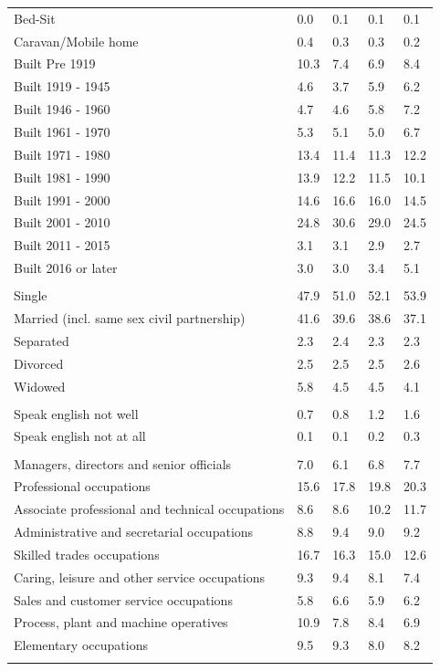 \documentclass{article}
\begin{document}
\begin{table}[h]
\begin{tabular}{KTTTT}
Bed-Sit & 0.0& 0.1& 0.1& 0.1\\
Caravan/Mobile home & 0.4& 0.3& 0.3& 0.2\\
    \hline
Built Pre 1919 & 10.3&  7.4&  6.9&  8.4\\
Built 1919 - 1945 & 4.6& 3.7& 5.9& 6.2\\
Built  1946 - 1960 & 4.7& 4.6& 5.8& 7.2\\
Built  1961 - 1970 & 5.3& 5.1& 5.0& 6.7\\
Built  1971 - 1980 & 13.4& 11.4& 11.3& 12.2\\
Built  1981 - 1990 & 13.9& 12.2& 11.5& 10.1\\
Built  1991 - 2000 & 14.6& 16.6& 16.0& 14.5\\
Built  2001 - 2010 & 24.8& 30.6& 29.0& 24.5\\
Built  2011 - 2015 & 3.1& 3.1& 2.9& 2.7\\
Built  2016 or later & 3.0& 3.0& 3.4& 5.1\\
\hline
    \\
    \hline
Single & 47.9& 51.0& 52.1& 53.9\\
Married (incl. same sex civil partnership) & 41.6& 39.6& 38.6& 37.1\\
Separated  & 2.3& 2.4& 2.3& 2.3\\
Divorced  & 2.5& 2.5& 2.5& 2.6\\
Widowed & 5.8& 4.5& 4.5& 4.1\\
\hline
    \\ 
    \hline
Speak english not well & 0.7& 0.8& 1.2& 1.6\\
Speak english not at all & 0.1& 0.1& 0.2& 0.3\\
\hline
    \\
    \hline
Managers, directors and senior officials & 7.0& 6.1& 6.8& 7.7\\
Professional occupations & 15.6& 17.8& 19.8& 20.3\\
Associate professional and technical occupations &  8.6&  8.6& 10.2& 11.7\\
Administrative and secretarial occupations & 8.8& 9.4& 9.0& 9.2\\
Skilled trades occupations & 16.7& 16.3& 15.0& 12.6\\
Caring, leisure and other service occupations & 9.3& 9.4& 8.1& 7.4\\
Sales and customer service occupations & 5.8& 6.6& 5.9& 6.2\\
Process, plant and machine operatives & 10.9&  7.8&  8.4&  6.9\\
Elementary occupations & 9.5& 9.3& 8.0& 8.2\\
\hline
\end{tabular}
\end{table}
\end{document}
